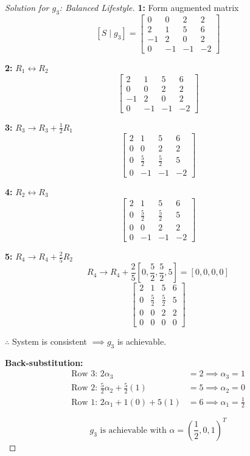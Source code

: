 \documentclass[12pt]{article}
\theoremstyle{definition}
\begin{document}
\begin{proof}[Solution for $g_3$: Balanced Lifestyle]

\textbf{1:} Form augmented matrix
\[
[S \mid g_3] = \left[\begin{array}{ccc|c}
0 & 0 & 2 & 2 \\
2 & 1 & 5 & 6 \\
-1 & 2 & 0 & 2 \\
0 & -1 & -1 & -2
\end{array}\right]
\]

\textbf{2:} $R_1 \leftrightarrow R_2$
\[
\left[\begin{array}{ccc|c}
2 & 1 & 5 & 6 \\
0 & 0 & 2 & 2 \\
-1 & 2 & 0 & 2 \\
0 & -1 & -1 & -2
\end{array}\right]
\]

\textbf{3:} $R_3 \to R_3 + \frac{1}{2}R_1$
\[
\left[\begin{array}{ccc|c}
2 & 1 & 5 & 6 \\
0 & 0 & 2 & 2 \\
0 & \frac{5}{2} & \frac{5}{2} & 5 \\
0 & -1 & -1 & -2
\end{array}\right]
\]

\textbf{4:} $R_2 \leftrightarrow R_3$
\[
\left[\begin{array}{ccc|c}
2 & 1 & 5 & 6 \\
0 & \frac{5}{2} & \frac{5}{2} & 5 \\
0 & 0 & 2 & 2 \\
0 & -1 & -1 & -2
\end{array}\right]
\]

\textbf{5:} $R_4 \to R_4 + \frac{2}{5}R_2$
\[
R_4 \to R_4 + \frac{2}{5}\left[0, \frac{5}{2}, \frac{5}{2}, 5\right] = \left[0, 0, 0, 0\right]
\]
\[
\left[\begin{array}{ccc|c}
2 & 1 & 5 & 6 \\
0 & \frac{5}{2} & \frac{5}{2} & 5 \\
0 & 0 & 2 & 2 \\
0 & 0 & 0 & 0
\end{array}\right]
\]

$\therefore$ System is consistent $\implies g_3$ is achievable.

\textbf{Back-substitution:}
\begin{align*}
\text{Row 3: } 2\alpha_3 &= 2 \implies \alpha_3 = 1 \\
\text{Row 2: } \frac{5}{2}\alpha_2 + \frac{5}{2}(1) &= 5 \implies \alpha_2 = 0 \\
\text{Row 1: } 2\alpha_1 + 1(0) + 5(1) &= 6 \implies \alpha_1 = \frac{1}{2}
\end{align*}

\[
\boxed{g_3 \text{ is achievable with } \alpha = \left(\frac{1}{2}, 0, 1\right)^T}
\]
\end{proof}
\end{document}
